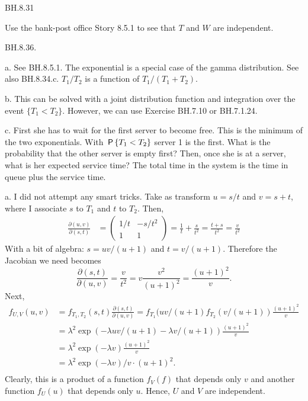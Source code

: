 \setcounter{theorem}{30}
\begin{exercise}
BH.8.31
\begin{hint}
Use the bank-post office Story 8.5.1 to see that $T$ and $W$ are independent.
\end{hint}
\end{exercise}


\setcounter{theorem}{35}
\begin{exercise}
BH.8.36.
\begin{hint}
a. See BH.8.5.1. The exponential is a special case of the gamma distribution. See also BH.8.34.c. $T_1/T_2$ is a function of $T_1/(T_1+T_2)$.

b. This can be solved with a joint distribution function and integration over the event $\{T_1<T_2\}$. However, we can use Exercise BH.7.10 or BH.7.1.24.

c. First she has to wait for the first server to become free. This is the minimum of the two exponentials.
With $\P{T_1<T_2}$ server 1 is the first.
What is the probability that the other server is empty first? Then, once she is at a server, what is her expected service time? The total time in the system is the time in queue plus the service time.
\end{hint}
\begin{solution}
a. I did not attempt any smart tricks. Take as transform $u=s/t$ and $v=s+t$, where I associate $s$ to $T_{1}$ and $t$  to $T_2$. Then,
\begin{align*}
\frac{\partial (u,v)}{\partial (s,t)} &=
  \begin{pmatrix}
    1/t & -s/t^{2} \\
1 & 1
  \end{pmatrix} = \frac 1 t + \frac{s}{t^{2}} = \frac{t+s}{t^{2}} = \frac{v}{t^{2}}
\end{align*}
With a bit of algebra: $s=uv/(u+1)$ and $t=v/(u+1)$.
Therefore the Jacobian we need becomes
\begin{equation}
\label{eq:12}
\frac{\partial (s,t)}{\partial (u,v)} = \frac{v}{t^{2}} = v \frac{v^2}{(u+1)^2} = \frac{(u+1)^{2}}{v}.
\end{equation}
Next,
\begin{align*}
  f_{U, V}(u,v) &= f_{T_1,T_2}(s,t) \frac{\partial (s,t)}{\partial (u,v)}
  =  f_{T_1}(uv/(u+1) f_{T_2}(v/(u+1)) \frac{(u+1)^{2}}{v} \\
  &=  \lambda^{2} \exp(-\lambda uv/(u+1) - \lambda v/(u+1)) \frac{(u+1)^{2}}{v} \\
  &=  \lambda^{2} \exp(-\lambda v) \frac{(u+1)^{2}}{v} \\
  &=  \lambda^{2} \exp(-\lambda v)/v \cdot  (u+1)^{2}. \\
\end{align*}
Clearly, this is a product of a function $f_{V}(f)$ that depends only  $v$ and another function $f_U(u)$ that depends  only $u$. Hence, $U$ and $V$ are independent.


\end{solution}
\end{exercise}
